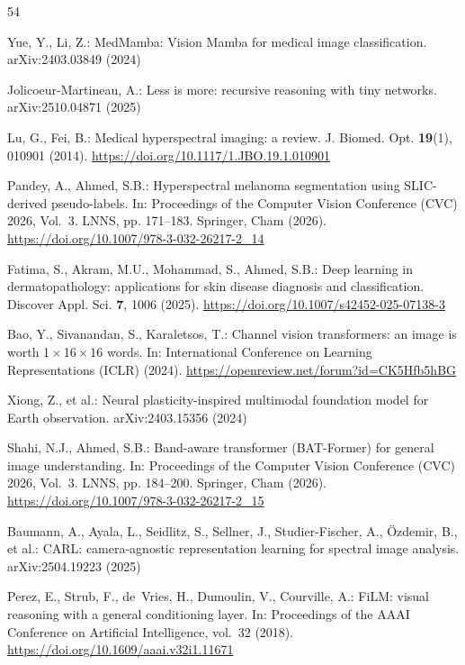 \documentclass{svproc}
\begin{document}
\begin{thebibliography}{54}

Yue, Y., Li, Z.: MedMamba: Vision Mamba for medical image classification. arXiv:2403.03849 (2024)

Jolicoeur-Martineau, A.: Less is more: recursive reasoning with tiny networks. arXiv:2510.04871 (2025)

Lu, G., Fei, B.: Medical hyperspectral imaging: a review. J. Biomed. Opt. \textbf{19}(1), 010901 (2014). \url{https://doi.org/10.1117/1.JBO.19.1.010901}

Pandey, A., Ahmed, S.B.: Hyperspectral melanoma segmentation using SLIC-derived pseudo-labels. In: Proceedings of the Computer Vision Conference (CVC) 2026, Vol.~3. LNNS, pp. 171--183. Springer, Cham (2026). \url{https://doi.org/10.1007/978-3-032-26217-2_14}

Fatima, S., Akram, M.U., Mohammad, S., Ahmed, S.B.: Deep learning in dermatopathology: applications for skin disease diagnosis and classification. Discover Appl. Sci. \textbf{7}, 1006 (2025). \url{https://doi.org/10.1007/s42452-025-07138-3}

Bao, Y., Sivanandan, S., Karaletsos, T.: Channel vision transformers: an image is worth 1\,$\times$\,16\,$\times$\,16 words. In: International Conference on Learning Representations (ICLR) (2024). \url{https://openreview.net/forum?id=CK5Hfb5hBG}

Xiong, Z., et al.: Neural plasticity-inspired multimodal foundation model for Earth observation. arXiv:2403.15356 (2024)

Shahi, N.J., Ahmed, S.B.: Band-aware transformer (BAT-Former) for general image understanding. In: Proceedings of the Computer Vision Conference (CVC) 2026, Vol.~3. LNNS, pp. 184--200. Springer, Cham (2026). \url{https://doi.org/10.1007/978-3-032-26217-2_15}

Baumann, A., Ayala, L., Seidlitz, S., Sellner, J., Studier-Fischer, A., \"{O}zdemir, B., et al.: CARL: camera-agnostic representation learning for spectral image analysis. arXiv:2504.19223 (2025)

Perez, E., Strub, F., de~Vries, H., Dumoulin, V., Courville, A.: FiLM: visual reasoning with a general conditioning layer. In: Proceedings of the AAAI Conference on Artificial Intelligence, vol.~32 (2018). \url{https://doi.org/10.1609/aaai.v32i1.11671}


\end{thebibliography}
\end{document}
